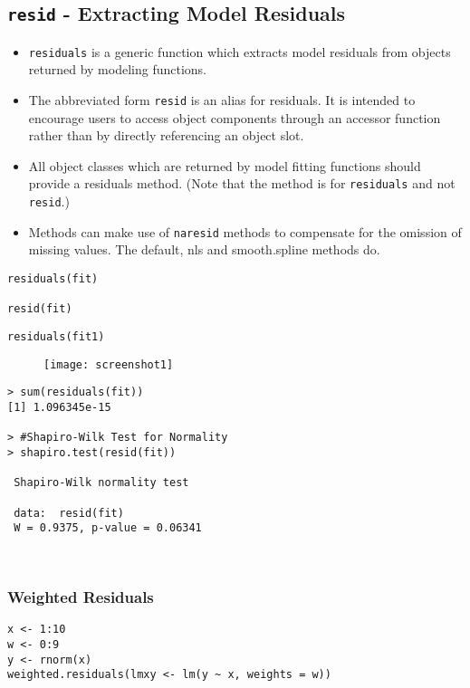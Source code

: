 \documentclass[residuals.tex]{subfiles}
\begin{document}
\Large
\newpage
\subsection{\texttt{resid} - Extracting Model Residuals}


\begin{itemize}
\item \texttt{residuals} is a generic function which extracts model residuals from objects returned by modeling functions. 

\item The abbreviated form \texttt{resid} is an alias for residuals. It is intended to encourage users to access object components through an accessor function rather than by directly referencing an object slot. 

\item All object classes which are returned by model fitting functions should provide a residuals method. (Note that the method is for \texttt{residuals} and not \texttt{resid}.) 

\item Methods can make use of \texttt{naresid} methods to compensate for the omission of missing values. The default, nls and smooth.spline methods do. 
\end{itemize}
\newpage
\begin{framed}
\begin{verbatim}
residuals(fit)

resid(fit)
\end{verbatim}
\end{framed}
\begin{framed}
\begin{verbatim}
residuals(fit1)
\end{verbatim}
\end{framed}
\begin{figure}[h!]
\centering
\texttt{[image: screenshot1]}
\caption{}
\label{fig:screenshot1}
\end{figure}
\begin{verbatim}
> sum(residuals(fit))
[1] 1.096345e-15

> #Shapiro-Wilk Test for Normality
> shapiro.test(resid(fit))
 
 Shapiro-Wilk normality test
 
 data:  resid(fit)
 W = 0.9375, p-value = 0.06341
 
 
\end{verbatim}

\newpage
\subsubsection*{Weighted Residuals}
\begin{framed}
\begin{verbatim}
x <- 1:10
w <- 0:9
y <- rnorm(x)
weighted.residuals(lmxy <- lm(y ~ x, weights = w))
\end{verbatim}
\end{framed}
\end{document}
